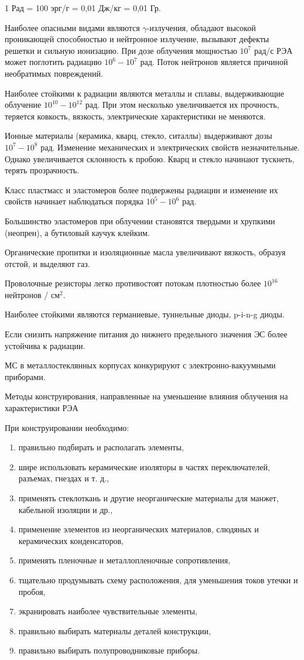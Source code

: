 \documentclass[unicode, 12pt, a4paper, oneside]{article}
\begin{document}
1 Рад = 100 эрг/г = 0,01 Дж/кг = 0,01 Гр.

Наиболее опасными видами являются $\gamma$-излучения, обладают высокой проникающей способностью и нейтронное излучение, вызывают дефекты решетки и сильную ионизацию. При дозе облучения мощностью $10^7$ рад/с РЭА может поглотить радиацию $10^6 - 10^7$ рад. Поток нейтронов является причиной необратимых повреждений.

Наиболее стойкими к радиации являются металлы и сплавы, выдерживающие облучение $10^{10} - 10^{12}$ рад. При этом несколько увеличивается их прочность, теряется ковкость, вязкость, электрические характеристики не меняются.

Ионные материалы (керамика, кварц, стекло, ситаллы) выдерживают дозы $10^7 - 10^8$ рад. Изменение механических и электрических свойств незначительные. Однако увеличивается склонность к пробою. Кварц и стекло начинают тускнеть, терять прозрачность.

Класс пластмасс и эластомеров более подвержены радиации и изменение их свойств начинает наблюдаться порядка $10^5 - 10^6$ рад.

Большинство эластомеров при облучении становятся твердыми и хрупкими (неопрен), а бутиловый каучук клейким.

Органические пропитки и изоляционные масла увеличивают вязкость, образуя отстой, и выделяют газ.

Проволочные резисторы легко противостоят потокам плотностью более $10^{16}$ нейтронов / см$^2$.

Наиболее стойкими являются германиевые, туннельные диоды, p-i-n-g диоды.

Если снизить напряжение питания до нижнего предельного значения ЭС более устойчива к радиации.

МС в металлостеклянных корпусах конкурируют с электронно-вакуумными приборами.

Методы конструирования, направленные на уменьшение влияния облучения на характеристики РЭА

При конструировании необходимо:

\begin{enumerate}
\item правильно подбирать и располагать элементы,
\item шире использовать керамические изоляторы в частях переключателей, разъемах, гнездах и т. д.,
\item применять стеклоткань и другие неорганические материалы для манжет, кабельной изоляции и др.,
\item применение элементов из неорганических материалов, слюдяных и керамических конденсаторов,
\item применять пленочные и металлопленочные сопротивления,
\item тщательно продумывать схему расположения, для уменьшения токов утечки и пробоя,
\item экранировать наиболее чувствительные элементы,
\item правильно выбирать материалы деталей конструкции,
\item правильно выбирать полупроводниковые приборы.
\end{enumerate}
\end{document}
